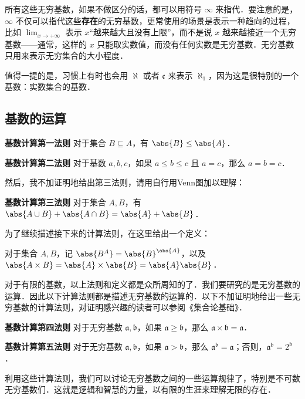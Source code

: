 所有这些无穷基数，如果不做区分的话，都可以用符号 $\infty$ 来指代．要注意的是，$\infty$ 不仅可以指代这些\textbf{存在}的无穷基数，更常使用的场景是表示一种趋向的过程，比如 $\lim_{x\rightarrow +\infty}$ 表示 $x$“越来越大且没有上限”，而不是说 $x$ 越来越接近一个无穷基数——通常，这样的 $x$ 只能取实数值，而没有任何实数是无穷基数．无穷基数只用来表示无穷集合的大小程度．

值得一提的是，习惯上有时也会用 $\aleph$ 或者 $\mathfrak{c}$ 来表示 $\aleph_1$，因为这是很特别的一个基数：实数集合的基数．




\subsection{基数的运算}

\begin{theorem}{}
\textbf{基数计算第一法则} 对于集合 $B\subseteq A$，有 $\abs{B}\leq\abs{A}$．
\end{theorem}

\begin{theorem}{}
\textbf{基数计算第二法则} 对于基数 $a, b, c$，如果 $a\leq b\leq c$ 且 $a=c$，那么 $a=b=c$．
\end{theorem}

然后，我不加证明地给出第三法则，请用自行用Venn图加以理解：

\begin{theorem}{}\label{CardiN_the1}
\textbf{基数计算第三法则} 对于集合 $A, B$，有 $\abs{A\cup B}+\abs{A\cap B}=\abs{A}+\abs{B}$．
\end{theorem}

为了继续描述接下来的计算法则，在这里给出一个定义：

\begin{definition}{}
对于集合 $A, B$，记 $\abs{B^A}=\abs{B}^{\abs{A}}$，以及 $\abs{A\times B}=\abs{A}\times\abs{B}=\abs{A}\abs{B}$．
\end{definition}

对于有限的基数，以上法则和定义都是众所周知的了．我们要研究的是无穷基数的运算．因此以下计算法则都是描述无穷基数的运算的．以下不加证明地给出一些无穷基数的计算法则，对证明感兴趣的读者可以参阅《集合论基础》\cite{BasicSetTheory}．

\begin{theorem}{}
\textbf{基数计算第四法则} 对于无穷基数 $\mathfrak{a}, \mathfrak{b}$，如果 $\mathfrak{a}\geq\mathfrak{b}$，那么 $\mathfrak{a}\times\mathfrak{b}=\mathfrak{a}$．
\end{theorem}

\begin{theorem}{}
\textbf{基数计算第五法则} 对于无穷基数 $\mathfrak{a}, \mathfrak{b}$，如果 $\mathfrak{a}>\mathfrak{b}$，那么 $\mathfrak{a}^\mathfrak{b}=\mathfrak{a}$；否则，$\mathfrak{a}^\mathfrak{b}=2^\mathfrak{b}$．
\end{theorem}


利用这些计算法则，我们可以讨论无穷基数之间的一些运算规律了，特别是不可数无穷基数们．这就是逻辑和智慧的力量，以有限的生涯来理解无限的存在．








